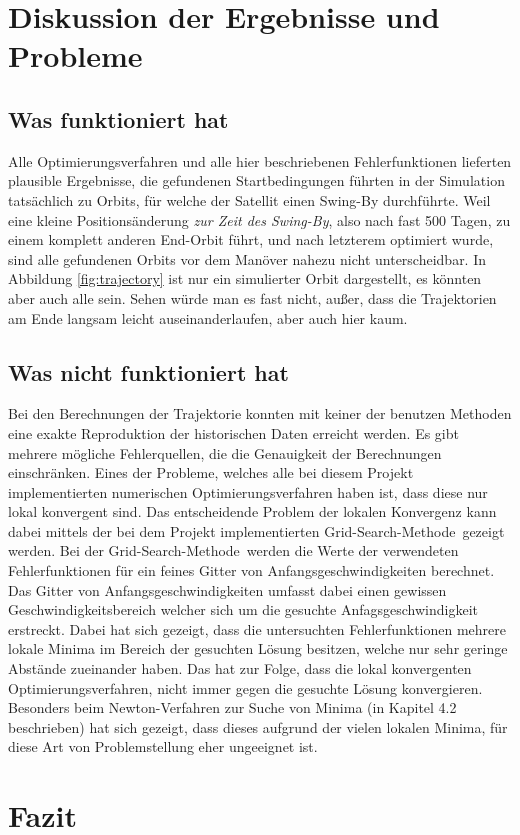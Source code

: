 \section{Diskussion der Ergebnisse und Probleme}

\subsection{Was funktioniert hat}

Alle Optimierungsverfahren und alle hier beschriebenen Fehlerfunktionen lieferten plausible Ergebnisse, die gefundenen Startbedingungen führten in der Simulation tatsächlich zu Orbits, für welche der Satellit einen Swing-By durchführte. Weil eine kleine Positionsänderung \textit{zur Zeit des Swing-By}, also nach fast 500 Tagen, zu einem komplett anderen End-Orbit führt, und nach letzterem optimiert wurde, sind alle gefundenen Orbits vor dem Manöver nahezu nicht unterscheidbar. In Abbildung \ref{fig:trajectory} ist nur ein simulierter Orbit dargestellt, es könnten aber auch alle sein. Sehen würde man es fast nicht, außer, dass die Trajektorien am Ende langsam leicht auseinanderlaufen, aber auch hier kaum.


\subsection{Was nicht funktioniert hat}

Bei den Berechnungen der Trajektorie konnten mit keiner der benutzen Methoden eine exakte Reproduktion der historischen Daten erreicht werden. Es gibt mehrere mögliche Fehlerquellen, die die Genauigkeit der Berechnungen einschränken. Eines der Probleme, welches alle bei diesem Projekt implementierten numerischen Optimierungsverfahren haben ist, dass diese nur lokal konvergent sind. Das entscheidende  Problem der lokalen Konvergenz kann dabei mittels der bei dem Projekt implementierten \glqq Grid-Search-Methode\grqq\, gezeigt werden. Bei der \glqq Grid-Search-Methode\grqq\, werden die Werte der verwendeten Fehlerfunktionen für ein feines Gitter von Anfangsgeschwindigkeiten berechnet. Das Gitter von Anfangsgeschwindigkeiten umfasst dabei einen gewissen Geschwindigkeitsbereich welcher sich um die gesuchte Anfagsgeschwindigkeit erstreckt. Dabei hat sich gezeigt, dass die untersuchten Fehlerfunktionen mehrere lokale Minima im Bereich der gesuchten Lösung besitzen, welche nur sehr geringe Abstände zueinander haben. Das hat zur Folge, dass die lokal konvergenten Optimierungsverfahren, nicht immer gegen die gesuchte Lösung konvergieren. Besonders beim Newton-Verfahren zur Suche von Minima (in Kapitel 4.2 beschrieben) hat sich gezeigt, dass dieses aufgrund der vielen lokalen Minima, für diese Art von Problemstellung eher ungeeignet ist.

\section{Fazit}




